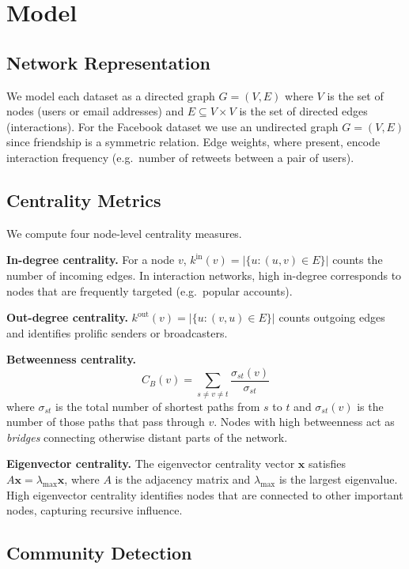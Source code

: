 \section{Model}
\label{sec:model}

\subsection{Network Representation}

We model each dataset as a directed graph $G = (V, E)$ where $V$ is the
set of nodes (users or email addresses) and $E \subseteq V \times V$ is the
set of directed edges (interactions).
For the Facebook dataset we use an undirected graph $G = (V, E)$ since
friendship is a symmetric relation.
Edge weights, where present, encode interaction frequency (e.g.\ number
of retweets between a pair of users).

\subsection{Centrality Metrics}

We compute four node-level centrality measures.

\textbf{In-degree centrality.}
For a node $v$, $k^{\text{in}}(v) = |\{u : (u,v) \in E\}|$ counts the number
of incoming edges. In interaction networks, high in-degree corresponds to
nodes that are frequently targeted (e.g.\ popular accounts).

\textbf{Out-degree centrality.}
$k^{\text{out}}(v) = |\{u : (v,u) \in E\}|$ counts outgoing edges and
identifies prolific senders or broadcasters.

\textbf{Betweenness centrality.}
\begin{equation}
    C_B(v) = \sum_{s \neq v \neq t} \frac{\sigma_{st}(v)}{\sigma_{st}}
\end{equation}
where $\sigma_{st}$ is the total number of shortest paths from $s$ to $t$
and $\sigma_{st}(v)$ is the number of those paths that pass through $v$.
Nodes with high betweenness act as \textit{bridges} connecting otherwise
distant parts of the network.

\textbf{Eigenvector centrality.}
The eigenvector centrality vector $\mathbf{x}$ satisfies
$A\mathbf{x} = \lambda_{\max} \mathbf{x}$,
where $A$ is the adjacency matrix and $\lambda_{\max}$ is the largest
eigenvalue. High eigenvector centrality identifies nodes that are connected
to other important nodes, capturing recursive influence.

\subsection{Community Detection}

